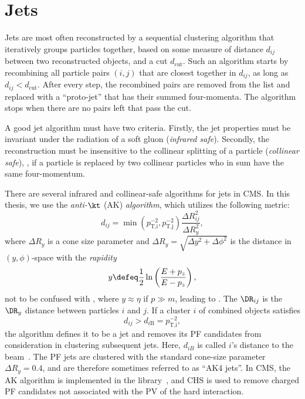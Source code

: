 \section{Jets}\label{sec:jets}


Jets are most often reconstructed by a sequential clustering algorithm that iteratively groups particles together, based on some measure of distance $d_{ij}$ between two reconstructed objects, and a cut $d_\text{cut}$.
Such an algorithm starts by recombining all particle pairs $(i,j)$ that are closest together in $d_{ij}$, as long as $d_{ij}<d_\text{cut}$. After every step, the recombined pairs are removed from the list and replaced with a ``proto-jet'' that has their summed four-momenta. The algorithm stops when there are no pairs left that pass the cut.

A good jet algorithm must have two criteria.
Firstly, the jet properties must be invariant under the radiation of a soft gluon (\emph{infrared safe}).
Secondly, the reconstruction must be insensitive to the collinear splitting of a particle (\emph{collinear safe}), \ie, if a particle is replaced by two collinear particles who in sum have the same four-momentum.

There are several infrared and collinear-safe algorithms for jets in CMS.
In this thesis, we use the \emph{anti-$\kt$} (AK) \emph{algorithm}, which utilizes the following metric:
\begin{equation} \label{eq:antikT}
  d_{ij} = \min\left(p_\text{T,i}^{-2},p_\text{T,j}^{-2}\right)\frac{\Delta R^2_{ij}}{\Delta R_y^2},
\end{equation}
where $\Delta R_y$ is a cone size parameter and $\Delta R_y=\sqrt{\Delta y^2+\Delta\phi^2}$ is the distance in $(y,\phi)$-space with the \emph{rapidity}
\begin{equation} \label{eq:rapidity}
  y \defeq \frac{1}{2}\ln\left(\frac{E+p_z}{E-p_z}\right),
\end{equation}
not to be confused with , where $y\approx\eta$ if $p\gg m$, leading to . The $\DR_{ij}$ is the $\DR_y$ distance between particles $i$ and $j$. 
If a cluster $i$ of combined objects satisfies
\begin{equation} \label{eq:antikT_cut}
  d_{ij} > d_{i\text{B}} = p_\text{T,i}^{-2},
\end{equation}
the algorithm defines it to be a jet and removes its PF candidates from consideration in clustering subsequent jets. Here, $d_{iB}$ is called $i$'s distance to the beam~\cite{PF2017,antikT}.
The PF jets are clustered with the standard cone-size parameter \mbox{$\Delta R_y=0.4$}, and are therefore sometimes referred to as ``AK4 jets''.
In CMS, the AK algorithm is implemented in the \FASTJET library~\cite{fastjet1,fastjet2}, and CHS is used to remove charged PF candidates not associated with the PV of the hard interaction.

